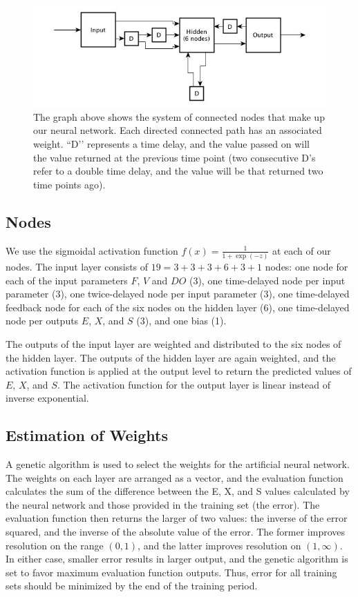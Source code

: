 \documentclass[10pt]{article}
\begin{document}
\begin{figure} %
\centering
\includegraphics[scale = .5]{network_graph_ryder.jpg}
\caption{The graph above shows the system of connected nodes that make up our neural network. Each directed connected path has an associated weight. ``D’’ represents a time delay, and the value passed on will the value returned at the previous time point (two consecutive D’s refer to a double time delay, and the value will be that returned two time points ago).}
\end{figure}

\subsection{Nodes}

We use the sigmoidal activation function $f(x) = \frac{1}{1+\exp(-z)}$ at each of our nodes. The input layer consists of $19=3+3+3+6+3+1$ nodes: one node for each of the input parameters $F$, $V$ and $DO$ (3), one time-delayed node per input parameter (3), one twice-delayed node per input parameter (3), one time-delayed feedback node for each of the six nodes on the hidden layer (6), one time-delayed node per outputs $E$, $X$, and $S$ (3), and one bias (1). 

The outputs of the input layer are weighted and distributed to the six nodes of the hidden layer. The outputs of the hidden layer are again weighted, and the activation function is applied at the output level to return the predicted values of $E$, $X$, and $S$. The activation function  for the output layer is linear instead of inverse exponential.

\subsection{Estimation of Weights}

A genetic algorithm is used to select the weights for the artificial neural network. The weights on each layer are arranged as a vector, and the evaluation function calculates the sum of the difference between the E, X, and S values calculated by the neural network and those provided in the training set (the error). The evaluation function then returns the larger of two values: the inverse of the error squared, and the inverse of the absolute value of the error. The former improves resolution on the range $(0,1)$, and the latter improves resolution on $(1, \infty)$. In either case, smaller error results in larger output, and the genetic algorithm is set to favor maximum evaluation function outputs. Thus, error for all training sets should be minimized by the end of the training period.
\end{document}
